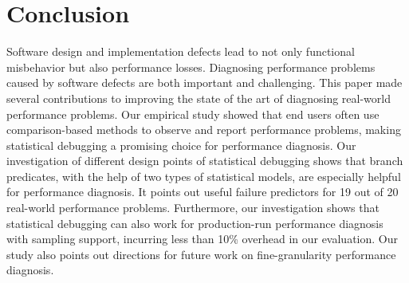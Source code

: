 \section{Conclusion}
\label{sec:con}
Software design and implementation defects lead to not only functional 
misbehavior but also performance losses. Diagnosing performance problems
caused by software defects are both important and challenging. This paper 
made several contributions to improving the state of the art of diagnosing
real-world performance problems. Our empirical study showed that end users
often use comparison-based methods to observe and report performance problems,
making statistical debugging a promising choice for performance diagnosis. 
Our investigation of different design points of statistical debugging shows
that branch predicates, with the help of two types of statistical models, are  
especially helpful for performance diagnosis. It points out useful failure
predictors for 19 out of 20 real-world performance problems. 
Furthermore, our investigation shows that statistical debugging can also
work for production-run performance diagnosis with sampling support, incurring 
less than 10\% overhead in our evaluation. Our study also points out
directions for future work on fine-granularity performance diagnosis.


  
